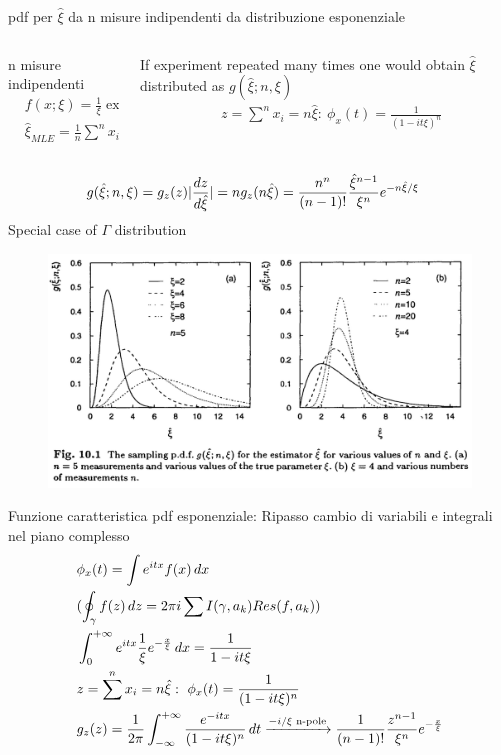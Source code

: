 \documentclass[asd-beamer.tex]{subfiles}
\begin{document}
\begin{frame}{pdf per $\hat{\xi}$ da n misure indipendenti da distribuzione esponenziale}
\begin{columns}[T]\begin{column}{0.4\textwidth}
n misure indipendenti
\begin{align*}
&f(x;\xi)=\frac{1}{\xi}\exp{-\frac{x}{\xi}}\\
&\hat{\xi}_{MLE}=\frac{1}{n}\sum^nx_i
\end{align*}
\end{column}\begin{column}{0.6\textwidth}
If experiment repeated many times one would obtain $\hat{\xi}$ distributed as $g(\hat{\xi};n,\xi)$
\begin{align*}
&z=\sum^nx_i=n\hat{\xi}:\ \phi_x(t)=\frac{1}{(1-it\xi)^n}
\end{align*}
\end{column}\end{columns}
\begin{align*}
&g(\hat{\xi};n,\xi)=g_z(z)|\frac{d z}{d \hat{\xi}}|=ng_z(n\hat{\xi})=\frac{n^n}{(n-1)!}\frac{\hat{\xi}^{n-1}}{\xi^n}e^{-n\hat{\xi}/\xi}
\end{align*}
Special case of $\Gamma$ distribution
\begin{figure}[!ht]\includegraphics[trim={0cm 0cm 0 0},clip, keepaspectratio,height=0.4\textheight]{figures/cowan/estimators/pdfestexp}\label{fig:pdfestexp}\end{figure}
\end{frame}

\begin{wordonframe}{Funzione caratteristica pdf esponenziale: Ripasso cambio di variabili e integrali nel piano complesso}
\begin{align*}
&\phi_x(t)=\int e^{itx}f(x)\,dx\\
&(\oint_{\gamma}f(z)\,dz=2\pi i\sum I(\gamma,a_k)Res(f,a_k))\\
&\int_{0}^{+\infty}{}e^{itx}\frac{1}{\xi}e^{-\frac{x}{\xi}}\,dx=\frac{1}{1-it\xi}\\
&z=\sum^nx_i=n\hat{\xi}:\ \phi_x(t)=\frac{1}{(1-it\xi)^n}\\
&g_z(z)=\frac{1}{2\pi}\int_{-\infty}^{+\infty}{}\frac{e^{-itx}}{(1-it\xi)^n}\,dt\xrightarrow{-i/\xi \text{ n-pole}}\frac{1}{(n-1)!}\frac{z^{n-1}}{\xi^n}e^{-\frac{x}{\xi}}\\
\end{align*}
\end{wordonframe}
\end{document}
